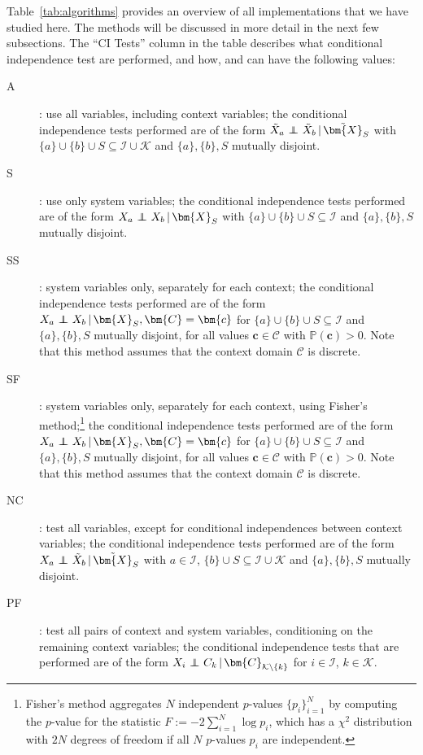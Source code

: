 \documentclass[twoside,11pt]{article}
\DeclareMathOperator*{\CI}{{\,\perp\mkern-12mu\perp\,}}
\newcommand{\Prb}{\mathbb{P}}
\newcommand\B[1]{\bm{#1}}
\newcommand\C[1]{\mathcal{#1}}
\newcommand\BC[1]{\bm{\mathcal{#1}}}
\newcommand\given{\,|\,}
\begin{document}
Table~\ref{tab:algorithms} provides an overview of all implementations that we have 
studied here. The methods will be discussed in more detail in the next few subsections.
The ``CI Tests'' column in the table describes what conditional
independence test are performed, and how, and can have the following values:
\begin{description}
\item[A]: use all variables, including context variables; the conditional independence
  tests performed are of the form $\tilde{X}_a \CI \tilde{X}_b \given \tilde{\B{X}}_S$ with $\{a\} \cup \{b\} \cup S \subseteq \C{I} \cup \C{K}$
  and $\{a\}, \{b\}, S$ mutually disjoint.
\item[S]: use only system variables; the conditional independence tests performed are 
  of the form $X_a \CI X_b \given \B{X}_S$ with $\{a\} \cup \{b\} \cup S \subseteq \C{I}$
  and $\{a\}, \{b\}, S$ mutually disjoint.
\item[SS]: system variables only, separately for each context; the conditional independence tests performed
  are of the form $X_a \CI X_b \given \B{X}_S, \B{C}=\B{c}$ for $\{a\} \cup \{b\} \cup S \subseteq \C{I}$
  and $\{a\}, \{b\}, S$ mutually disjoint, for all values $\B{c} \in \BC{C}$ with $\Prb(\B{c}) > 0$.
  Note that this method assumes that the context domain $\BC{C}$ is discrete.
\item[SF]: system variables only, separately for each context, using Fisher's method;\footnote{Fisher's method \citep{Fisher1925}
  aggregates $N$ independent $p$-values $\{p_i\}_{i=1}^N$ by computing the $p$-value 
  for the statistic $F := -2 \sum_{i=1}^N \log p_i$, which has a $\chi^2$ distribution with $2 N$ degrees of freedom if all $N$ $p$-values $p_i$ are independent.}
  the conditional independence tests performed are of the form $X_a \CI X_b \given \B{X}_S, \B{C}=\B{c}$ for 
  $\{a\} \cup \{b\} \cup S \subseteq \C{I}$ and $\{a\}, \{b\}, S$ mutually disjoint, for all values $\B{c} \in \BC{C}$ with $\Prb(\B{c}) > 0$. Note that this method assumes that the context domain $\BC{C}$ is discrete.
\item[NC]: test all variables, except for conditional independences between context variables; the conditional independence
  tests performed are of the form $X_a \CI \tilde{X}_b \given \tilde{\B{X}}_S$ with $a \in \C{I}$, $\{b\} \cup S \subseteq \C{I} \cup \C{K}$ and $\{a\}, \{b\}, S$ mutually disjoint.
\item[PF]: test all pairs of context and system variables, conditioning on the remaining context variables; the conditional
  independence tests that are performed are of the form $X_i \CI C_k \given \B{C}_{\C{K} \setminus \{k\}}$ for $i \in \C{I}$, $k \in \C{K}$.
\end{description}
\end{document}
